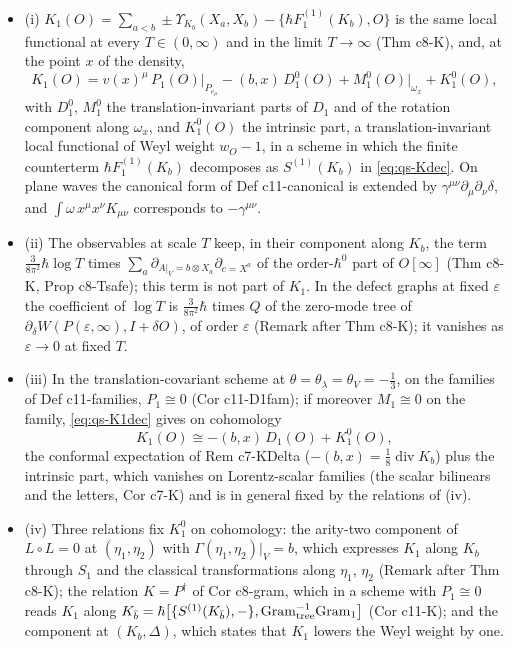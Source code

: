 \begin{proposition}
\label{prop:qs-K}
\begin{itemize}
\item (i) $K_1(O)=\sum_{a<b}\pm\Upsilon_{K_b}(X_a,X_b)-\{\hbar F_1^{(1)}(K_b),O\}$ is the same local functional at every $T\in(0,\infty)$ and in the limit $T\to\infty$ (Thm c8-K), and, at the point $x$ of the density,
\begin{equation}
K_1(O)=v(x)^\mu\,P_1(O)\big|_{P_{e_\mu}}-(b,x)\,D^0_1(O)+M^0_1(O)\big|_{\omega_x}+K^0_1(O),
\label{eq:qs-K1dec}
\end{equation}
with $D^0_1$, $M^0_1$ the translation-invariant parts of $D_1$ and of the rotation component along $\omega_x$, and $K^0_1(O)$ the intrinsic part, a translation-invariant local functional of Weyl weight $w_O-1$, in a scheme in which the finite counterterm $\hbar F_1^{(1)}(K_b)$ decomposes as $S^{(1)}(K_b)$ in \eqref{eq:qs-Kdec}. On plane waves the canonical form of Def c11-canonical is extended by $\gamma^{\mu\nu}\partial_\mu\partial_\nu\delta$, and $\int\omega\,x^\mu x^\nu K_{\mu\nu}$ corresponds to $-\gamma^{\mu\nu}$.
\item (ii) The observables at scale $T$ keep, in their component along $K_b$, the term $\tfrac3{8\pi^2}\hbar\log T$ times $\sum_a\partial_{A|_V=b\otimes X_a}\partial_{c=X^a}$ of the order-$\hbar^0$ part of $O[\infty]$ (Thm c8-K, Prop c8-Tsafe); this term is not part of $K_1$. In the defect graphs at fixed $\varepsilon$ the coefficient of $\log T$ is $\tfrac3{8\pi^2}\hbar$ times $Q$ of the zero-mode tree of $\partial_\delta W(P(\varepsilon,\infty),I+\delta O)$, of order $\varepsilon$ (Remark after Thm c8-K); it vanishes as $\varepsilon\to0$ at fixed $T$.
\item (iii) In the translation-covariant scheme at $\theta=\theta_\lambda=\theta_V=-\tfrac13$, on the families of Def c11-families, $P_1\cong0$ (Cor c11-D1fam); if moreover $M_1\cong0$ on the family, \eqref{eq:qs-K1dec} gives on cohomology
\[
K_1(O)\cong-(b,x)\,D_1(O)+K^0_1(O),
\]
the conformal expectation of Rem c7-KDelta ($-(b,x)=\tfrac18\operatorname{div}K_b$) plus the intrinsic part, which vanishes on Lorentz-scalar families (the scalar bilinears and the letters, Cor c7-K) and is in general fixed by the relations of (iv).
\item (iv) Three relations fix $K^0_1$ on cohomology: the arity-two component of $L\circ L=0$ at $(\eta_1,\eta_2)$ with $\Gamma(\eta_1,\eta_2)|_V=b$, which expresses $K_1$ along $K_b$ through $S_1$ and the classical transformations along $\eta_1$, $\eta_2$ (Remark after Thm c8-K); the relation $K=P^\dagger$ of Cor c8-gram, which in a scheme with $P_1\cong0$ reads $K_1$ along $K_{\bar b}=\hbar\big[\{S^{(1)}(K_{\bar b}),-\},\mathrm{Gram}_{\rm tree}^{-1}\mathrm{Gram}_1\big]$ (Cor c11-K); and the component at $(K_b,\Delta)$, which states that $K_1$ lowers the Weyl weight by one.
\end{itemize}
\end{proposition}

